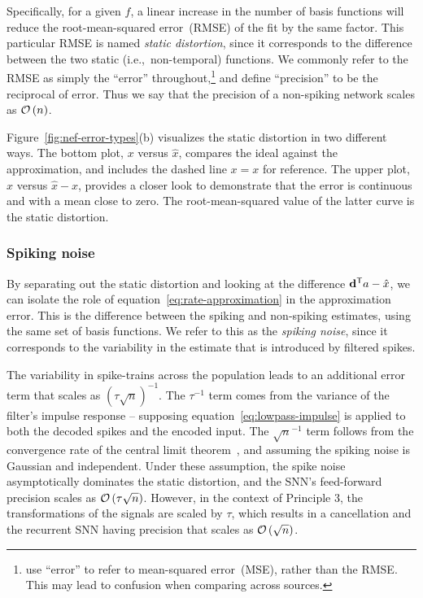 Specifically, for a given $f$, a linear increase in the number of basis functions will reduce the root-mean-squared error~(RMSE) of the fit by the same factor.
This particular RMSE is named \emph{static distortion}, since it corresponds to the difference between the two static (i.e.,~non-temporal) functions.
We commonly refer to the RMSE as simply the ``error'' throughout,\footnote{
\citet{eliasmith2003a} use ``error'' to refer to mean-squared error~(MSE), rather than the RMSE. This may lead to confusion when comparing across sources.}
and define ``precision'' to be the reciprocal of error.
Thus we say that the precision of a non-spiking network scales as $\mathcal{O}\left({n}\right)$.

Figure~\ref{fig:nef-error-types}(b) visualizes the static distortion in two different ways.
The bottom plot, $x$ versus $\hat{x}$, compares the ideal against the approximation, and includes the dashed line $x = x$ for reference.
The upper plot, $x$ versus $\hat{x} - x$, provides a closer look to demonstrate that the error is continuous and with a mean close to zero.
The root-mean-squared value of the latter curve is the static distortion.

\subsubsection{Spiking noise}

By separating out the static distortion and looking at the difference ${\mathbf{d}}^\mathsf{T}a - \hat{x}$, we can isolate the role of equation~\ref{eq:rate-approximation} in the approximation error.
This is the difference between the spiking and non-spiking estimates, using the same set of basis functions.
We refer to this as the \emph{spiking noise}, since it corresponds to the variability in the estimate that is introduced by filtered spikes.

The variability in spike-trains across the population leads to an additional error term that scales as $\left( \tau \sqrt{n} \right)^{-1}$.
The $\tau^{-1}$ term comes from the variance of the filter's impulse response -- supposing equation~\ref{eq:lowpass-impulse} is applied to both the decoded spikes and the encoded input.
The $\sqrt{n}^{-1}$ term follows from the convergence rate of the central limit theorem~\citep[CLT;][]{berry1941accuracy, esseen1942liapunov}, and assuming the spiking noise is Gaussian and independent.
Under these assumption, the spike noise asymptotically dominates the static distortion, and the SNN's feed-forward precision scales as $\mathcal{O}\left({\tau \sqrt{n}}\right)$.
However, in the context of Principle 3, the transformations of the signals are scaled by $\tau$, which results in a cancellation and the recurrent SNN having precision that scales as $\mathcal{O}\left({\sqrt{n}}\right)$.

